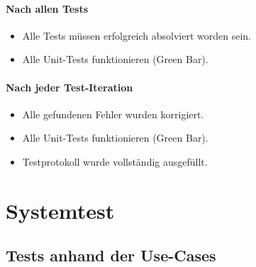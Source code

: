 \documentclass[12pt,halfparskip]{scrartcl}
\begin{document}
	\paragraph{Nach allen Tests}\label{ssub:nach_allen_tests} %
		\begin{itemize}
			\item Alle Tests müssen erfolgreich absolviert worden sein.
			\item Alle Unit-Tests funktionieren (Green Bar).
		\end{itemize}
	\paragraph{Nach jeder Test-Iteration}\label{ssub:nach_jeder_test_iteration} %
		\begin{itemize}
			\item Alle gefundenen Fehler wurden korrigiert.
			\item Alle Unit-Tests funktionieren (Green Bar).
			\item Testprotokoll wurde vollständig ausgefüllt.
		\end{itemize}

\section{Systemtest} %
\label{sec:systemtest}

\subsection{Tests anhand der Use-Cases}\label{sub:tests_anhand_der_use_cases} %
\end{document}
